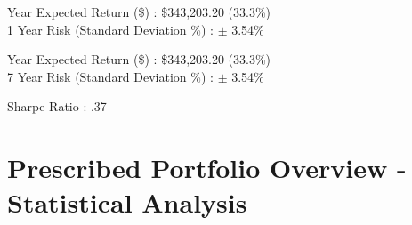 \documentclass{article}
\begin{document}
 Year Expected Return (\$) : \$343,203.20 (33.3\%)\\
1 Year Risk (Standard Deviation \%) : $\pm$ 3.54\%

 Year Expected Return (\$) : \$343,203.20 (33.3\%)\\
7 Year Risk (Standard Deviation \%) : $\pm$ 3.54\%

\noindent
Sharpe Ratio : .37

\newpage


\section{Prescribed Portfolio Overview - Statistical Analysis}

\vspace{1.5cm}

\end{document}

